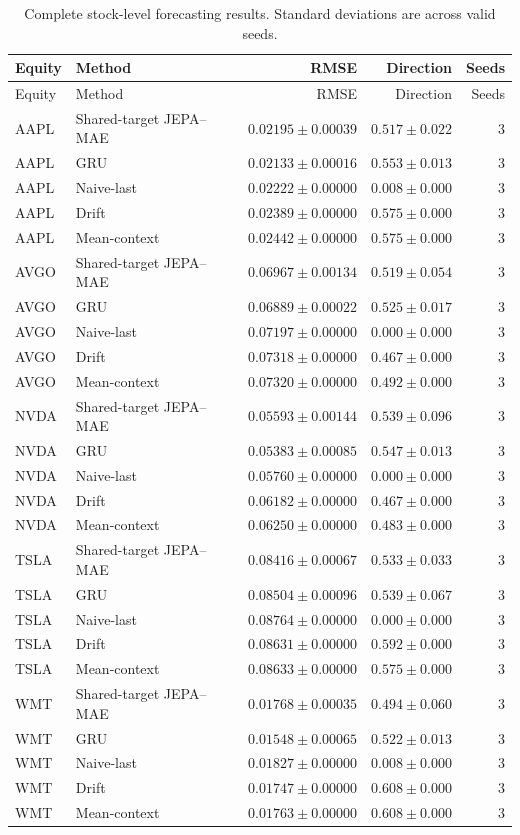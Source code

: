 \begin{longtable}{llrrr}
\caption{Complete stock-level forecasting results. Standard deviations are across valid seeds.}\label{tab:appendix_stock_metrics}\\
\toprule
Equity & Method & RMSE & Direction & Seeds \\
\midrule
\endfirsthead
\toprule
Equity & Method & RMSE & Direction & Seeds \\
\midrule
\endhead
AAPL & Shared-target JEPA--MAE & $0.02195 \pm 0.00039$ & $0.517 \pm 0.022$ & 3 \\
AAPL & GRU & $0.02133 \pm 0.00016$ & $0.553 \pm 0.013$ & 3 \\
AAPL & Naive-last & $0.02222 \pm 0.00000$ & $0.008 \pm 0.000$ & 3 \\
AAPL & Drift & $0.02389 \pm 0.00000$ & $0.575 \pm 0.000$ & 3 \\
AAPL & Mean-context & $0.02442 \pm 0.00000$ & $0.575 \pm 0.000$ & 3 \\
AVGO & Shared-target JEPA--MAE & $0.06967 \pm 0.00134$ & $0.519 \pm 0.054$ & 3 \\
AVGO & GRU & $0.06889 \pm 0.00022$ & $0.525 \pm 0.017$ & 3 \\
AVGO & Naive-last & $0.07197 \pm 0.00000$ & $0.000 \pm 0.000$ & 3 \\
AVGO & Drift & $0.07318 \pm 0.00000$ & $0.467 \pm 0.000$ & 3 \\
AVGO & Mean-context & $0.07320 \pm 0.00000$ & $0.492 \pm 0.000$ & 3 \\
NVDA & Shared-target JEPA--MAE & $0.05593 \pm 0.00144$ & $0.539 \pm 0.096$ & 3 \\
NVDA & GRU & $0.05383 \pm 0.00085$ & $0.547 \pm 0.013$ & 3 \\
NVDA & Naive-last & $0.05760 \pm 0.00000$ & $0.000 \pm 0.000$ & 3 \\
NVDA & Drift & $0.06182 \pm 0.00000$ & $0.467 \pm 0.000$ & 3 \\
NVDA & Mean-context & $0.06250 \pm 0.00000$ & $0.483 \pm 0.000$ & 3 \\
TSLA & Shared-target JEPA--MAE & $0.08416 \pm 0.00067$ & $0.533 \pm 0.033$ & 3 \\
TSLA & GRU & $0.08504 \pm 0.00096$ & $0.539 \pm 0.067$ & 3 \\
TSLA & Naive-last & $0.08764 \pm 0.00000$ & $0.000 \pm 0.000$ & 3 \\
TSLA & Drift & $0.08631 \pm 0.00000$ & $0.592 \pm 0.000$ & 3 \\
TSLA & Mean-context & $0.08633 \pm 0.00000$ & $0.575 \pm 0.000$ & 3 \\
WMT & Shared-target JEPA--MAE & $0.01768 \pm 0.00035$ & $0.494 \pm 0.060$ & 3 \\
WMT & GRU & $0.01548 \pm 0.00065$ & $0.522 \pm 0.013$ & 3 \\
WMT & Naive-last & $0.01827 \pm 0.00000$ & $0.008 \pm 0.000$ & 3 \\
WMT & Drift & $0.01747 \pm 0.00000$ & $0.608 \pm 0.000$ & 3 \\
WMT & Mean-context & $0.01763 \pm 0.00000$ & $0.608 \pm 0.000$ & 3 \\
\bottomrule
\end{longtable}
